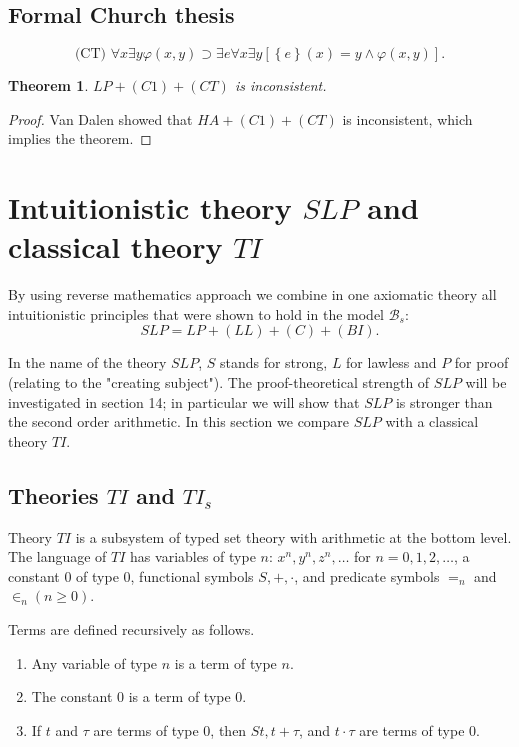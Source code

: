 \documentclass{asl}
\newtheorem{theorem}{Theorem}[section]
\theoremstyle{definition}
\begin{document}
\subsection{Formal Church thesis}

\[ \text{(CT)    } \forall x\exists y\varphi(x,y) \supset \exists e \forall x\exists y[\left\lbrace e\right\rbrace (x)=y \wedge \varphi(x,y)].\]

\begin{theorem}
$LP+(C1)+(CT)$ is inconsistent.
\label{theorem:CT}
\end{theorem}
\begin{proof}
Van Dalen \cite{vand78} showed that $HA+(C1)+(CT)$ is inconsistent, which implies the theorem.
\end{proof}

\section{Intuitionistic theory $SLP$ and classical theory $TI$}
By using reverse mathematics approach we combine in one axiomatic theory all intuitionistic principles that were shown to hold in the model $\mathcal{B}_s$:
\[SLP=LP+(LL)+(C)+(BI).\]

In the name of the theory $SLP$, $S$ stands for strong, $L$ for lawless and $P$ for proof (relating to the "creating subject"). The proof-theoretical strength of $SLP$ will be investigated in section 14; in particular we will show that $SLP$ is stronger than the second order arithmetic. In this section we compare $SLP$ with a classical theory $TI$.

\subsection{Theories $TI$ and $TI_s$}
Theory $TI$ is a subsystem of typed set theory with arithmetic at the bottom level. The language of $TI$ has variables of type $n$: $x^n,y^n,z^n,\ldots$ for $n=0,1,2,\ldots$, a constant 0 of type 0, functional symbols $S, +, \cdot$, and predicate symbols $=_n$ and $\in_n (n\geqslant 0)$.

Terms are defined recursively as follows.
\begin{enumerate}
\item Any variable of type $n$ is a term of type $n$.
\item The constant 0 is a term of type 0.
\item If $t$ and $\tau$ are terms of type 0, then $St, t+\tau$, and $t\cdot\tau$ are terms of type 0. 
\end{enumerate}
\end{document}
